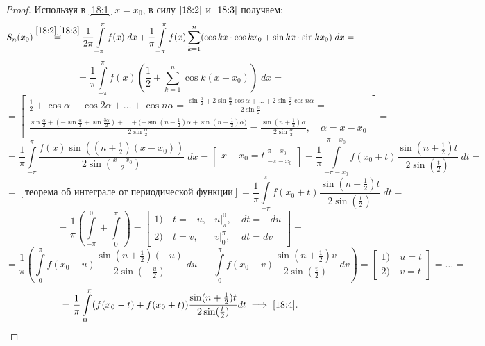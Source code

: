 \documentclass[../../main.tex]{subfiles}
\begin{document}
\begin{proof}
	Используя в \eqref{18:1} $x = x_0$, в силу $\eqref{18:2}$ и $\eqref{18:3}$ 
	получаем:
	\[S_n(x_0) \stackrel{\eqref{18:2}, \eqref{18:3}}{=}
	\dfrac{1}{2\pi}\int\limits_{-\pi}^{\pi}{f(x)\; dx} + \dfrac{1}{\pi}
	\int\limits_{-\pi}^{\pi}{f(x)}\sum\limits_{k=1}^{n}
	(\cos{kx}\cdot \cos{kx}_0 + \sin{kx}\cdot \sin{kx}_0)\; dx = \]
	\[ = \dfrac{1}{\pi}\int\limits_{-\pi}^{\pi}f(x)\left(\dfrac{1}{2} + 
	\sum\limits_{k=1}^{n}\cos k(x-x_0)\right)\; dx =\]
	\[=\left[ 
	\begin{gathered} 
	\frac{1}{2} + \cos\alpha + \cos{2\alpha} + \ldots + \cos{n\alpha} =
	\frac{\sin\frac{\alpha}{2} + 2\sin{\frac{\alpha}{2}}\cos\alpha + \ldots +
	2\sin{\frac{\alpha}{2}}\cos{n \alpha}}{2\sin{\frac{\alpha}{2}}} =
	\\\frac{\sin{\frac{\alpha}{2} + (-\sin{\frac{\alpha}{2}}+
	\sin{\frac{3\alpha}{2}}) + \ldots + (-\sin(n-\frac{1}{2})\alpha + 
	\sin{(n + \frac{1}{2})\alpha)}}}{2\sin\frac{\alpha}{2}} = 
	\frac{\sin(n + \frac{1}{2})\alpha}{2\sin{\frac{\alpha}{2}}},\quad
	\alpha = x - x_0
	\end{gathered} 
	\right] = \]
	\[=\dfrac{1}{\pi}\int\limits_{-\pi}^{\pi}
	{\dfrac{f(x)\sin((n + \frac{1}{2})(x - 
	x_0))}{2\sin\left(\frac{x-x_0}{2}\right)}}\; dx=
	\left[ 
	\begin{gathered} 
	x - x_0 = t\big|_{-\pi-x_0}^{\pi-x_0}
	\end{gathered} 
	\right]
	=\dfrac{1}{\pi}\int\limits_{-\pi-x_0}^{\pi - x_0}{f(x_0 + t)
	\dfrac{\sin(n + \frac{1}{2})t}{2\sin(\frac{t}{2})}}\; dt = \]
	\[=\left[
	\text{теорема об интеграле от периодической функции}
	\right] =
	\dfrac{1}{\pi}\int\limits_{-\pi}^{\pi}{f(x_0 + t)}
	\dfrac{\sin(n + \frac{1}{2})t}{2\sin(\frac{t}{2})}\; dt =\]
	\[= \dfrac{1}{\pi}\left(\int\limits_{-\pi}^{0} + \int\limits_{0}^{\pi}\right) 
	=
	\left[ 
	\begin{aligned} 
	1)\ & t = -u,& u\big|_{\pi}^{0},\ &  dt = -du\\
	2)\ & t= v,& v\big|_{0}^{\pi},\ &  dt = dv
	\end{aligned} 
	\right] =\]
	\[= \dfrac{1}{\pi}\left(\int\limits_{0}^{\pi}{f(x_0 - u)
	\dfrac{\sin(n + \frac{1}{2})(-u)}{2\sin(-\frac{u}{2})}}\; du\ +\ 
	\int\limits_{0}^{\pi}{f(x_0 + v)\dfrac{\sin(n + \frac{1}{2})v}
	{2\sin(\frac{v}{2})}}\; dv\right)=
	\left[ 
	\begin{aligned} 
	1)\ & u = t\\
	2)\ & v = t
	\end{aligned} 
	\right] =
	\ldots =\]
	\[= \dfrac{1}{\pi}\int\limits_{0}^{\pi}(f(x_0 - t) + 
	f(x_0 + t))\dfrac{\sin(n + \frac{1}{2})t}{2\sin(\frac{t}{2})}dt
	\implies \eqref{18:4}. \qedhere\]
\end{proof}
\end{document}
